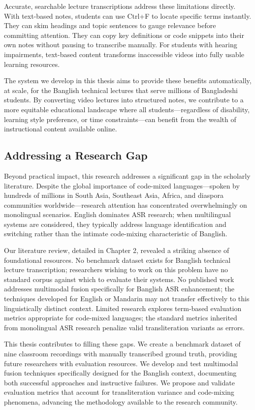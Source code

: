 Accurate, searchable lecture transcriptions address these limitations directly. With text-based notes, students can use Ctrl+F to locate specific terms instantly. They can skim headings and topic sentences to gauge relevance before committing attention. They can copy key definitions or code snippets into their own notes without pausing to transcribe manually. For students with hearing impairments, text-based content transforms inaccessible videos into fully usable learning resources.

The system we develop in this thesis aims to provide these benefits automatically, at scale, for the Banglish technical lectures that serve millions of Bangladeshi students. By converting video lectures into structured notes, we contribute to a more equitable educational landscape where all students---regardless of disability, learning style preference, or time constraints---can benefit from the wealth of instructional content available online.

\subsection{Addressing a Research Gap}

Beyond practical impact, this research addresses a significant gap in the scholarly literature. Despite the global importance of code-mixed languages---spoken by hundreds of millions in South Asia, Southeast Asia, Africa, and diaspora communities worldwide---research attention has concentrated overwhelmingly on monolingual scenarios. English dominates ASR research; when multilingual systems are considered, they typically address language identification and switching rather than the intimate code-mixing characteristic of Banglish.

Our literature review, detailed in Chapter 2, revealed a striking absence of foundational resources. No benchmark dataset exists for Banglish technical lecture transcription; researchers wishing to work on this problem have no standard corpus against which to evaluate their systems. No published work addresses multimodal fusion specifically for Banglish ASR enhancement; the techniques developed for English or Mandarin may not transfer effectively to this linguistically distinct context. Limited research explores term-based evaluation metrics appropriate for code-mixed languages; the standard metrics inherited from monolingual ASR research penalize valid transliteration variants as errors.

This thesis contributes to filling these gaps. We create a benchmark dataset of nine classroom recordings with manually transcribed ground truth, providing future researchers with evaluation resources. We develop and test multimodal fusion techniques specifically designed for the Banglish context, documenting both successful approaches and instructive failures. We propose and validate evaluation metrics that account for transliteration variance and code-mixing phenomena, advancing the methodology available to the research community.

